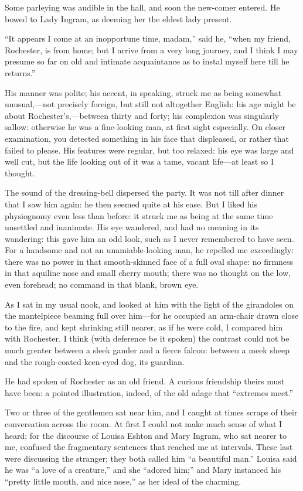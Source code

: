 Some parleying was audible in the hall, and soon the new-comer entered.
He bowed to Lady Ingram, as deeming her the eldest lady present.

\enquote{It appears I come at an inopportune time, madam,} said he,
\enquote{when my friend, \Mr{} Rochester, is from home; but I arrive from
	a very long journey, and I think I may presume so far on old and
	intimate acquaintance as to instal myself here till he returns.}

His manner was polite; his accent, in speaking, struck me as being
somewhat unusual,---not precisely foreign, but still not altogether
English: his age might be about \Mr{} Rochester's,---between thirty and
forty; his complexion was singularly sallow: otherwise he was a
fine-looking man, at first sight especially. On closer examination, you
detected something in his face that displeased, or rather that failed to
please. His features were regular, but too relaxed: his eye was large
and well cut, but the life looking out of it was a tame, vacant
life---at least so I thought.

The sound of the dressing-bell dispersed the party. It was not till
after dinner that I saw him again: he then seemed quite at his ease.
But I liked his physiognomy even less than before: it struck me as being
at the same time unsettled and inanimate. His eye wandered, and had no
meaning in its wandering: this gave him an odd look, such as I never
remembered to have seen. For a handsome and not an unamiable-looking
man, he repelled me exceedingly: there was no power in that
smooth-skinned face of a full oval shape: no firmness in that aquiline
nose and small cherry mouth; there was no thought on the low, even
forehead; no command in that blank, brown eye.

As I sat in my usual nook, and looked at him with the light of the
girandoles on the mantelpiece beaming full over him---for he occupied an
arm-chair drawn close to the fire, and kept shrinking still nearer, as
if he were cold, I compared him with \Mr{} Rochester. I think (with
deference be it spoken) the contrast could not be much greater between a
sleek gander and a fierce falcon: between a meek sheep and the
rough-coated keen-eyed dog, its guardian.

He had spoken of \Mr{} Rochester as an old friend. A curious friendship
theirs must have been: a pointed illustration, indeed, of the old adage
that \enquote{extremes meet.}

Two or three of the gentlemen sat near him, and I caught at times scraps
of their conversation across the room. At first I could not make much
sense of what I heard; for the discourse of Louisa Eshton and Mary
Ingram, who sat nearer to me, confused the fragmentary sentences that
reached me at intervals. These last were discussing the stranger; they
both called him \enquote{a beautiful man.} Louisa said he was
\enquote{a love of a creature,} and she \enquote{adored him;} and Mary
instanced his \enquote{pretty little mouth, and nice nose,} as her ideal
of the charming.

